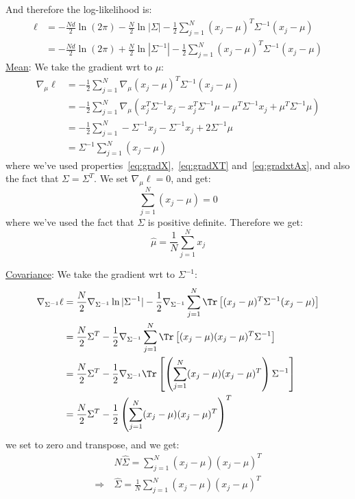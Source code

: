 \documentclass{article}
\begin{document}
And therefore the log-likelihood is:
\begin{align*}
  \ell &= - \frac{Nd}{2} \ln (2 \pi) - \frac{N}{2} \ln | \Sigma |  - \frac{1}{2} \sum_{j=1}^{N} (x_j- \mu)^{T} \Sigma ^{-1} (x_j - \mu) \\ 
  &= - \frac{Nd}{2} \ln (2 \pi) + \frac{N}{2} \ln | \Sigma ^{-1} |  - \frac{1}{2} \sum_{j=1}^{N} (x_j- \mu)^{T} \Sigma ^{-1} (x_j - \mu)
\end{align*}
\ul{Mean}: We take the gradient wrt to $\mu$:
\begin{align*}
  \nabla_{\mu} \ell &= -\frac{1}{2} \sum_{j=1}^{N} \nabla_{\mu} (x_j - \mu)^{T} \Sigma ^{-1}  (x_j - \mu) \\
  &= -\frac{1}{2} \sum_{j=1}^{N} \nabla_{\mu} \left( x_j ^{T} \Sigma ^{-1} x_j - x_j ^{T} \Sigma ^{-1}  \mu - \mu ^{T} \Sigma ^{-1}  x_j + \mu ^{T} \Sigma ^{-1}  \mu \right) \\
 &= -\frac{1}{2} \sum_{j=1}^{N} - \Sigma ^{-1} x_j - \Sigma ^{-1} x_j + 2 \Sigma ^{-1}  \mu \\
  &= \Sigma ^{-1}  \sum_{j=1}^{N} (x_j - \mu)
\end{align*}
where we've used properties~\cref{eq:gradX},~\cref{eq:gradXT} and~\cref{eq:gradxtAx}, and also the fact that $\Sigma = \Sigma ^{T}$. We set $\nabla_{\mu} \ell = 0$, and get:
\[
  \sum_{j=1}^{N} (x_j - \mu) = 0
\]
where we've used the fact that $\Sigma$ is positive definite. Therefore we get:
\[
  \hat{\mu}  = \frac{1}{N} \sum_{j=1}^{N}x_j
\]


\ul{Covariance}: We take the gradient wrt to $\Sigma ^{-1}$:
\begin{align*}
  \nabla_{ \Sigma ^{-1} } \ell &= \frac{N}{2} \nabla_{ \Sigma ^{-1}  } \ln | \Sigma ^{-1}  | - \frac{1}{2} \nabla_{\Sigma ^{-1} }  \sum_{j=1}^{N} \Tr \left[ (x_j - \mu)^{T} \Sigma ^{-1} (x_j - \mu) \right]  \\
  &= \frac{N}{2 } \Sigma ^{T} - \frac{1}{2}  \nabla_{ \Sigma ^{-1} }  \sum_{j=1}^{N} \Tr \left[ (x_j - \mu) (x_j - \mu)^{T} \Sigma ^{-1}  \right] \\ 
  &= \frac{N}{2 } \Sigma ^{T} - \frac{1}{2}  \nabla_{ \Sigma ^{-1} } \Tr \left[ \left( \sum_{j=1}^{N} (x_j-\mu) (x_j - \mu) ^{T} \right) \Sigma ^{-1}  \right]\\
  &= \frac{N}{2} \Sigma ^{T}  - \frac{1}{2 }\left( \sum_{j=1}^{N} (x_j - \mu) (x_j - \mu) ^{T}  \right) ^{T} 
\end{align*}
we set to zero and transpose, and we get:
\begin{align*}
  & N \hat{\Sigma} = \sum_{j=1}^{N} (x_j-\mu) (x_j- \mu) ^{T}  \\
  \Rightarrow \  & \hat{\Sigma}  = \frac{1}{N} \sum_{j=1}^{N} (x_j - \mu) (x_j - \mu)^{T} 
\end{align*}
\end{document}
